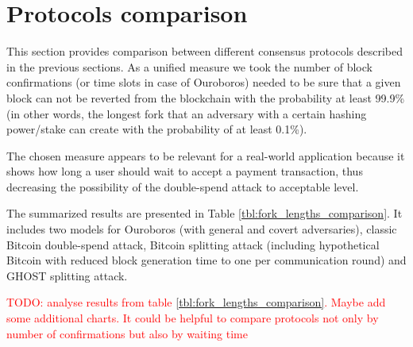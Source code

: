 \documentclass[10pt,a4paper]{article}
\newcommand\myworries[1]{\textcolor{red}{#1}}
\numberwithin{equation}{section} %
\theoremstyle{plain}
\theoremstyle{definition}
\theoremstyle{remark}
\begin{document}
	\section{Protocols comparison}
	
	This section provides comparison between different consensus protocols described in the previous sections. As a unified measure we took the number of block confirmations (or time slots in case of Ouroboros) needed to be sure that a given block can not be reverted from the blockchain with the probability at least 99.9\% (in other words, the longest fork that an adversary with a certain hashing power/stake can create with the probability of at least 0.1\%). 
	
	The chosen measure appears to be relevant for a real-world application because it shows how long a user should wait to accept a payment transaction, thus decreasing the possibility of the double-spend attack to acceptable level.
	
	The summarized results are presented in Table \ref{tbl:fork_lengths_comparison}. It includes two models for Ouroboros (with general and covert adversaries), classic Bitcoin double-spend attack, Bitcoin splitting attack (including hypothetical Bitcoin with reduced block generation time to one per communication round) and GHOST splitting attack.
	
	\myworries{TODO: analyse results from table \ref{tbl:fork_lengths_comparison}. Maybe add some additional charts. It could be helpful to compare protocols not only by number of confirmations but also by waiting time}
	
\end{document}
